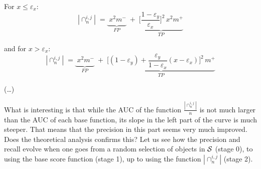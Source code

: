 \documentclass[twocolumn,english]{article}
\begin{document}
\smallskip
For $x \leq \varepsilon_x$:
\begin{equation}
|\cap_n^{i,j}| \; = \underbrace{\;  x^2 m^-_{~}}_{FP} \; + \; \underbrace{\biggl[\frac{1-\varepsilon_y}{\varepsilon_x}\biggr]^2 \, x^2 m^+}_{TP}
\end{equation}

and for $x > \varepsilon_x$:
\begin{equation}
|\cap_n^{i,j}| \; = \underbrace{\;  x^2 m^-_{~}}_{FP} \; + \; \underbrace{\biggl[(1-\varepsilon_y) + \frac{\varepsilon_y}{1-\varepsilon_x} (x-\varepsilon_x)\biggr]^2 \,  m^+}_{TP}
\end{equation}

(\ldots)

What is interesting is that while the AUC of the function $\frac{|\cap_n^{i,j}|}{n}$ is not much larger than the AUC of each base function, its slope in the left part of the curve is much steeper. That means that the precision in this part seems very much improved. Does the theoretical analysis confirms this? Let us see how the precision and recall evolve when one goes from a random selection of objects in $\cal S$ (stage 0), to using the base score function (stage 1), up to using the function $|\cap_n^{i,j}|$ (stage 2).
\end{document}
